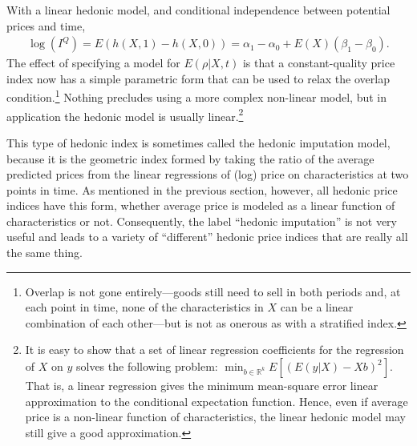 \documentclass[
]{article}
\begin{document}
With a linear hedonic model, and conditional independence between potential prices and time,
\begin{align*}
\log(I^{Q}) = E(h(X, 1) - h(X, 0)) = \alpha_{1} - \alpha_{0} + E(X)(\beta_{1} - \beta_{0}). 
\end{align*}
The effect of specifying a model for \(E(\rho | X, t)\) is that a constant-quality price index now has a simple parametric form that can be used to relax the overlap condition.\footnote{Overlap is not gone entirely---goods still need to sell in both periods and, at each point in time, none of the characteristics in \(X\) can be a linear combination of each other---but is not as onerous as with a stratified index.} Nothing precludes using a more complex non-linear model, but in application the hedonic model is usually linear.\footnote{It is easy to show that a set of linear regression coefficients for the regression of \(X\) on \(y\) solves the following problem: \(\min_{b \in \mathbb{R}^{k}} E[(E(y | X) - Xb)^{2}]\). That is, a linear regression gives the minimum mean-square error linear approximation to the conditional expectation function. Hence, even if average price is a non-linear function of characteristics, the linear hedonic model may still give a good approximation.}

This type of hedonic index is sometimes called the hedonic imputation model, because it is the geometric index formed by taking the ratio of the average predicted prices from the linear regressions of (log) price on characteristics at two points in time. As mentioned in the previous section, however, all hedonic price indices have this form, whether average price is modeled as a linear function of characteristics or not. Consequently, the label ``hedonic imputation'' is not very useful and leads to a variety of ``different'' hedonic price indices that are really all the same thing.
\end{document}
